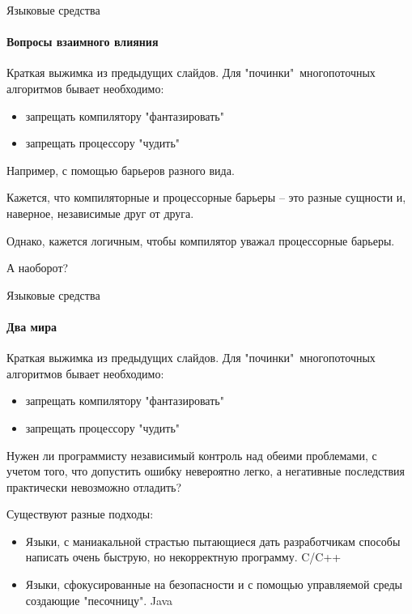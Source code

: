 \begin{frame}[t]{Языковые средства}
\framesubtitle{Вопросы взаимного влияния}

Краткая выжимка из предыдущих слайдов. Для "починки"\ многопоточных алгоритмов бывает необходимо:
\begin{itemize}
  \item запрещать компилятору "фантазировать"
  \item запрещать процессору "чудить"
\end{itemize}

\pause
Например, с помощью барьеров разного вида. 

\pause
Кажется, что компиляторные и процессорные барьеры -- это разные сущности и, наверное, независимые друг от друга. 

\pause
Однако, кажется логичным, чтобы компилятор уважал процессорные барьеры.

\pause
А наоборот?
\end{frame}

\begin{frame}[t]{Языковые средства}
\framesubtitle{Два мира}

Краткая выжимка из предыдущих слайдов. Для "починки"\ многопоточных алгоритмов бывает необходимо:
\begin{itemize}
  \item запрещать компилятору "фантазировать"
  \item запрещать процессору "чудить"
\end{itemize}

Нужен ли программисту независимый контроль над обеими проблемами, с учетом того, что допустить ошибку невероятно легко, а негативные последствия практически невозможно отладить?

\pause
Существуют разные подходы:
\begin{itemize}
  
  \pause
  \item Языки, с маниакальной страстью пытающиеся дать разработчикам способы написать очень быструю, но некорректную программу.
  \pause
  C/C++

  \pause
  \item Языки, сфокусированные на безопасности и с помощью управляемой среды создающие "песочницу".
  \pause
  Java
\end{itemize}
\end{frame}


